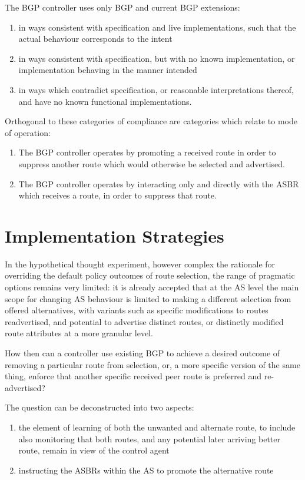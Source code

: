 The BGP controller uses only BGP and current BGP extensions:
\begin{enumerate}
	\item  in ways consistent with specification and live implementations, such that the actual behaviour corresponds to the intent
	\item  in ways consistent with specification, but with no known implementation, or implementation behaving in the manner intended
	\item  in ways which contradict specification, or reasonable interpretations thereof, and have no known functional implementations.
\end{enumerate}

Orthogonal to these categories of compliance are categories which relate to
mode of operation:
\begin{enumerate}
	\item The BGP controller operates by promoting a received route in order to suppress another route which would otherwise be selected and advertised.
	\item The BGP controller operates by interacting only and directly with the ASBR which receives a route, in order to suppress that route.
\end{enumerate}

\section{Implementation Strategies}

In the hypothetical thought experiment, however complex the rationale for
overriding the default policy outcomes of route selection, the range of
pragmatic options remains very limited:
it is already accepted that at the AS level the main scope for changing AS
behaviour is limited to making a different selection from offered alternatives,
with variants such as specific modifications to routes readvertised, and
potential to advertise distinct routes, or distinctly modified route attributes
at a more granular level.

How then can a controller use existing BGP to achieve a desired outcome of
removing a particular route from selection, or, a more specific version of the
same thing, enforce that another specific received peer route is preferred and
re-advertised?

The question can be deconstructed into two aspects:

\begin{enumerate}
	\item the element of learning of both the unwanted and alternate route, to include also monitoring that both routes, and any potential later arriving better route, remain in view of the control agent
	\item instructing the ASBRs within the AS to promote the alternative route
\end{enumerate}

